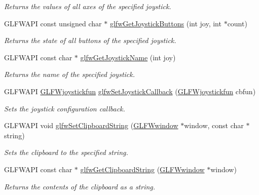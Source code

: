 \begin{DoxyCompactItemize}
\begin{DoxyCompactList}\small\item\em Returns the values of all axes of the specified joystick. \end{DoxyCompactList}\item 
G\+L\+F\+W\+A\+PI const unsigned char $\ast$ \hyperlink{group__input_ga211004a8dc7c18814c23f63fd2ac7b2c}{glfw\+Get\+Joystick\+Buttons} (int joy, int $\ast$count)
\begin{DoxyCompactList}\small\item\em Returns the state of all buttons of the specified joystick. \end{DoxyCompactList}\item 
G\+L\+F\+W\+A\+PI const char $\ast$ \hyperlink{group__input_ga1a17206f462496c2fd7d811ce6d3726e}{glfw\+Get\+Joystick\+Name} (int joy)
\begin{DoxyCompactList}\small\item\em Returns the name of the specified joystick. \end{DoxyCompactList}\item 
G\+L\+F\+W\+A\+PI \hyperlink{group__input_gaa67aa597e974298c748bfe4fb17d406d}{G\+L\+F\+Wjoystickfun} \hyperlink{group__input_ga07524a1122a03642b1d28822ea931094}{glfw\+Set\+Joystick\+Callback} (\hyperlink{group__input_gaa67aa597e974298c748bfe4fb17d406d}{G\+L\+F\+Wjoystickfun} cbfun)
\begin{DoxyCompactList}\small\item\em Sets the joystick configuration callback. \end{DoxyCompactList}\item 
G\+L\+F\+W\+A\+PI void \hyperlink{group__input_ga7a580309bbc185a0459c3559021d2fd7}{glfw\+Set\+Clipboard\+String} (\hyperlink{group__window_ga3c96d80d363e67d13a41b5d1821f3242}{G\+L\+F\+Wwindow} $\ast$window, const char $\ast$string)
\begin{DoxyCompactList}\small\item\em Sets the clipboard to the specified string. \end{DoxyCompactList}\item 
G\+L\+F\+W\+A\+PI const char $\ast$ \hyperlink{group__input_ga315b28b05797d00fe7cdf1ecfdc638dc}{glfw\+Get\+Clipboard\+String} (\hyperlink{group__window_ga3c96d80d363e67d13a41b5d1821f3242}{G\+L\+F\+Wwindow} $\ast$window)
\begin{DoxyCompactList}\small\item\em Returns the contents of the clipboard as a string. \end{DoxyCompactList}\item 

\end{DoxyCompactItemize}
